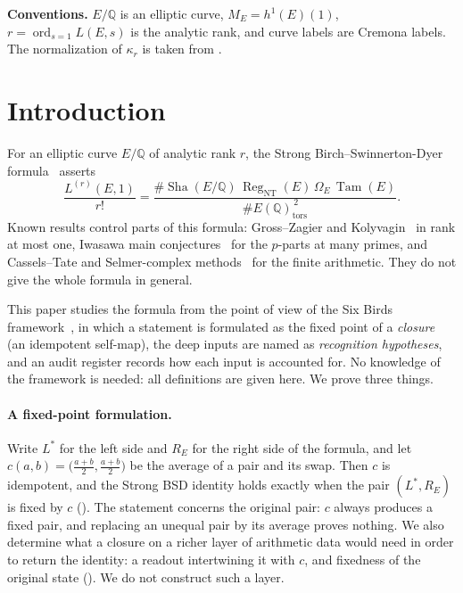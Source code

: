 \documentclass[11pt]{article}
\theoremstyle{definition}
\newcommand{\Q}{\mathbb{Q}}
\newcommand{\Sha}{\operatorname{Sha}}
\newcommand{\Reg}{\operatorname{Reg}}
\newcommand{\Tam}{\operatorname{Tam}}
\newcommand{\tors}{\operatorname{tors}}
\newcommand{\kapr}{\kappa_r}
\begin{document}
\medskip
\noindent
\textbf{Conventions.} $E/\Q$ is an elliptic curve, $M_E=h^1(E)(1)$,
$r=\operatorname{ord}_{s=1}L(E,s)$ is the analytic rank, and curve labels
are Cremona labels.  The normalization of $\kapr$ is taken from
\citet{TsiokosBSDApparatus2026}.

\section{Introduction}\label{sec:introduction}


For an elliptic curve $E/\Q$ of analytic rank $r$, the Strong
Birch--Swinnerton-Dyer formula~\citep{BirchSwinnertonDyer1965,Tate1966bsd}
asserts
\[
  \frac{L^{(r)}(E,1)}{r!}
  =
  \frac{\#\Sha(E/\Q)\,\Reg_{\mathrm{NT}}(E)\,\Omega_E\,\Tam(E)}
       {\#E(\Q)_{\tors}^{\,2}} .
\]
Known results control parts of this formula: Gross--Zagier and
Kolyvagin~\citep{GrossZagier1986,Kolyvagin1989} in rank at most one,
Iwasawa main conjectures~\citep{SkinnerUrban2014} for the $p$-parts at
many primes, and Cassels--Tate and Selmer-complex
methods~\citep{Flach1990,Nekovar2006} for the finite arithmetic.  They do
not give the whole formula in general.

This paper studies the formula from the point of view of the Six Birds
framework~\citep{TsiokosFoundationsIII2026,TsiokosAOR2026}, in which a
statement is formulated as the fixed point of a \emph{closure} (an
idempotent self-map), the deep inputs are named as \emph{recognition
hypotheses}, and an audit register records how each input is accounted
for.  No knowledge of the framework is needed: all definitions are given
here.  We prove three things.

\paragraph{A fixed-point formulation.}
Write $L^*$ for the left side and $R_E$ for the right side of the formula,
and let $c(a,b)=\bigl(\frac{a+b}2,\frac{a+b}2\bigr)$ be the average of a
pair and its swap.  Then $c$ is idempotent, and the Strong BSD identity
holds exactly when the pair $(L^*,R_E)$ is fixed by $c$
().  The statement concerns
the original pair: $c$ always produces a fixed pair, and replacing an
unequal pair by its average proves nothing.  We also determine what a
closure on a richer layer of arithmetic data would need in order to
return the identity: a readout intertwining it with $c$, and fixedness of
the original state ().  We do not
construct such a layer.
\end{document}
